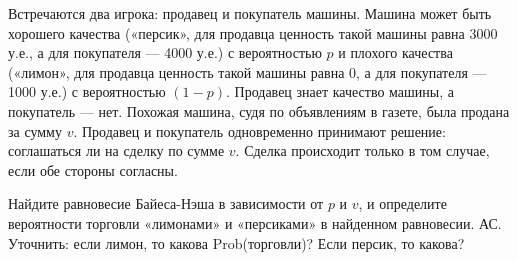\begin{problem}\par
\begin{source} \cite[1.7]{slanthcev:gt} \end{source}
Встречаются два игрока: продавец и покупатель машины. Машина может быть хорошего качества («персик», для продавца ценность такой машины равна 3000 у.е., а для покупателя — 4000 у.е.) с вероятностью  $p$  и плохого качества («лимон», для продавца ценность такой машины равна 0, а для покупателя — 1000 у.е.) с вероятностью  $\left(1-p\right)$. Продавец знает качество машины, а покупатель — нет. Похожая машина, судя по объявлениям в газете, была продана за сумму  $v$. Продавец и покупатель одновременно принимают решение: соглашаться ли на сделку по сумме  $v$. Сделка происходит только в том случае, если обе стороны согласны.\par
Найдите равновесие Байеса-Нэша в зависимости от  $p$  и  $v$,  и определите вероятности торговли «лимонами» и «персиками» в найденном равновесии.
{\red АС. Уточнить: если лимон, то какова Prob(торговли)? Если персик, то какова?}


\begin{sol}

\end{sol}
\end{problem}



